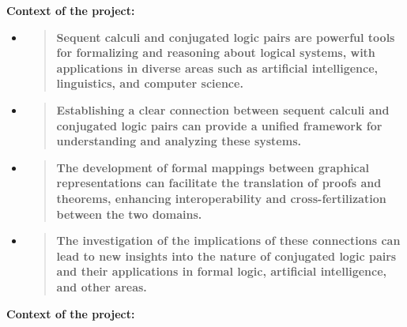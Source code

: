 \textbf{Context of the project:}

\begin{itemize}
\item
  \begin{quote}
  \textbf{Sequent calculi and conjugated logic pairs are powerful tools
  for formalizing and reasoning about logical systems, with applications
  in diverse areas such as artificial intelligence, linguistics, and
  computer science.\\
  }
  \end{quote}
\item
  \begin{quote}
  \textbf{Establishing a clear connection between sequent calculi and
  conjugated logic pairs can provide a unified framework for
  understanding and analyzing these systems.\\
  }
  \end{quote}
\item
  \begin{quote}
  \textbf{The development of formal mappings between graphical
  representations can facilitate the translation of proofs and theorems,
  enhancing interoperability and cross-fertilization between the two
  domains.\\
  }
  \end{quote}
\item
  \begin{quote}
  \textbf{The investigation of the implications of these connections can
  lead to new insights into the nature of conjugated logic pairs and
  their applications in formal logic, artificial intelligence, and other
  areas.}
  \end{quote}
\end{itemize}

\textbf{Context of the project:}

